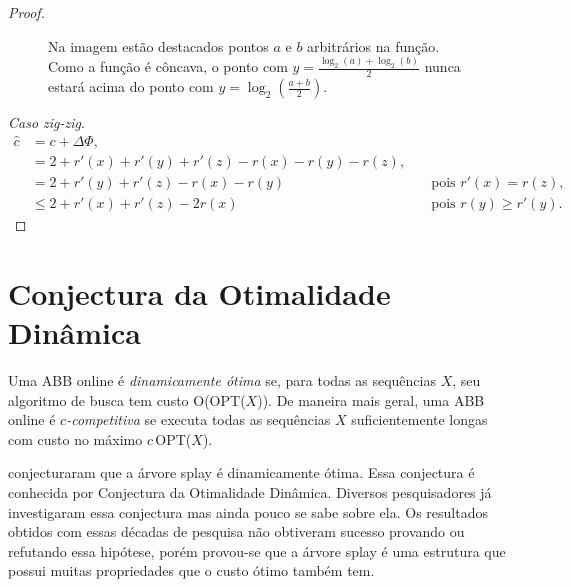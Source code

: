 \begin{proof}
\begin{figure}
    \caption{Na imagem estão destacados pontos $a$ e $b$ arbitrários na função. Como a função é côncava, o ponto com $y = \frac{\log_2(a) + \log_2(b)}{2}$ nunca estará acima do ponto com $y = \log_2(\frac{a+b}{2})$.}
    \label{fig:log}
    \end{figure}
    
    \textit{Caso zig-zig}.   
    \begin{align*}
        \hat{c} &= c + \Delta \Phi,\\
        &= 2 + r'(x) + r'(y) + r'(z) - r(x) - r(y) - r(z), \quad & \text{}\\
        &= 2 + r'(y) + r'(z) - r(x) - r(y) \quad & \text{pois $r'(x) = r(z)$},\\
        &\leq 2 + r'(x) + r'(z) - 2r(x) \quad & \text{pois $r(y) \geq r'(y)$}.
    \end{align*}



\end{proof}


\section{Conjectura da Otimalidade Dinâmica}

Uma ABB online é \textit{dinamicamente ótima} se, para todas as sequências $X$, seu algoritmo de busca tem custo O(OPT($X$)). De maneira mais geral, uma ABB online é \textit{$c$-competitiva} se executa todas as sequências $X$ suficientemente longas com custo no máximo $c$\,OPT($X$).

\cite{selfadjustingbst} conjecturaram que a árvore splay é dinamicamente ótima. Essa conjectura é conhecida por Conjectura da Otimalidade Dinâmica. Diversos pesquisadores já investigaram essa conjectura mas ainda pouco se sabe sobre ela. Os resultados obtidos com essas décadas de pesquisa não obtiveram sucesso provando ou refutando essa hipótese, porém provou-se que a árvore splay é uma estrutura que possui muitas propriedades que o custo ótimo também tem.